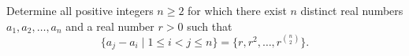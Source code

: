 Determine all positive integers $n\geq 2$ for which there exist $n$ distinct
real numbers $a_1, a_2, \dots, a_n $ and a real number $r > 0$ such that
$$\big\{a_j-a_i \mid 1 \le i < j \le n \big\} = \big\{ r,r^2,\dots, r^{\binom{n}{2}} \big\}.$$
